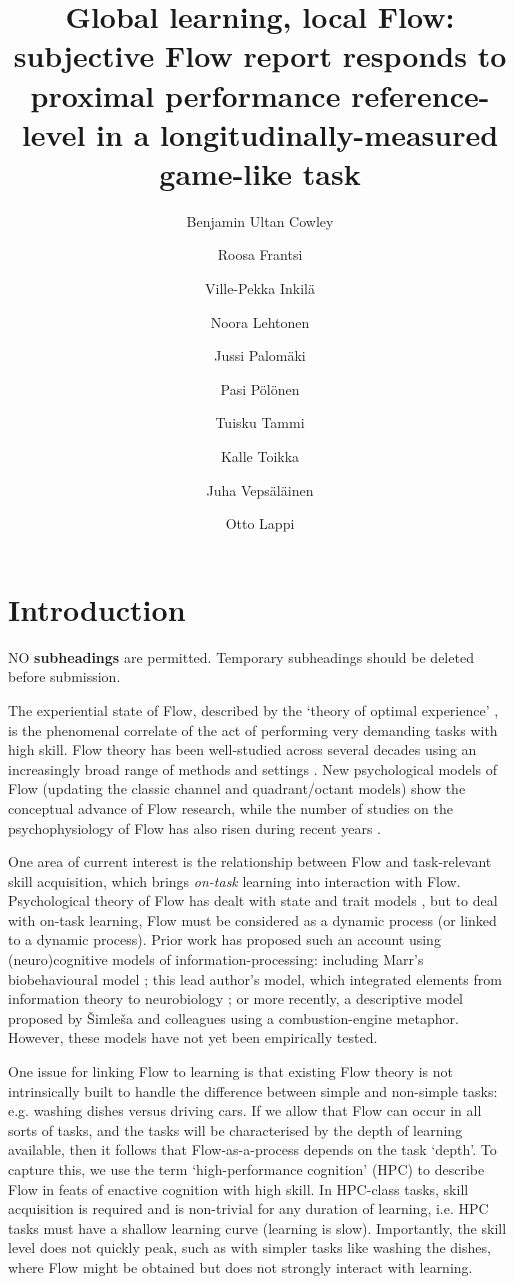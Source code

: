 \documentclass[fleqn,10pt]{wlscirep}
\title{Global learning, local Flow: subjective Flow report responds to proximal performance reference-level in a longitudinally-measured game-like task}
\author[1,2,*]{Benjamin Ultan Cowley}
\author[1]{Roosa Frantsi}%
\author[1,3]{Ville-Pekka Inkil\"{a}}%
\author[1]{Noora Lehtonen}%
\author[1]{Jussi Palom\"{a}ki}%
\author[1]{Pasi P\"{o}l\"{o}nen}
\author[1]{Tuisku Tammi}%
\author[1]{Kalle Toikka}%
\author[1]{Juha Veps\"{a}l\"{a}inen}%
\author[1]{Otto Lappi}
\affil[1]{Cognitive Science, Department of Digital Humanities, University of Helsinki, Helsinki, Finland}
\affil[2]{Cognitive Brain Research Unit, Department of Psychology and Logopedics, University of Helsinki,
Helsinki, Finland}
\affil[3]{Digitalization, Finnish Institute of Occupational Health, Helsinki, Finland}
\affil[*]{ben.cowley@helsinki.fi}
\affil[+]{these authors contributed equally to this work}
\begin{document}
\flushbottom
\maketitle
\thispagestyle{empty}

\section*{Introduction}
{\sf NO \textbf{subheadings} are permitted. Temporary subheadings should be deleted before submission.}

The experiential state of Flow, described by the `theory of optimal experience' \cite{Nakamura2002}, is the phenomenal correlate of the act of performing very demanding tasks with high skill. Flow theory has been well-studied across several decades using an increasingly broad range of methods and settings \cite{Engeser2012intro}. New psychological models of Flow \cite{Keller2012} (updating the classic channel and quadrant/octant models) show the conceptual advance of Flow research, while the number of studies on the psychophysiology of Flow has also risen during recent years \cite{Peifer2012,Peifer2014,Wolf2015,Harmat2015,Labonte-LeMoyne2016}.

One area of current interest is the relationship between Flow and task-relevant skill acquisition, which brings {\it on-task} learning into interaction with Flow. Psychological theory of Flow has dealt with state and trait models \cite{Moneta2012}, but to deal with on-task learning, Flow must be considered as a dynamic process (or linked to a dynamic process). Prior work has proposed such an account using (neuro)cognitive models of information-processing: including Marr's biobehavioural model \cite{Marr2001}; this lead author's model, which integrated elements from information theory to neurobiology \cite{Cowley2008}; or more recently, a descriptive model proposed by {\v{S}}imle{\v{s}}a and colleagues \cite{Simlesa2018} using a combustion-engine metaphor. However, these models have not yet been empirically tested.

One issue for linking Flow to learning is that existing Flow theory is not intrinsically built to handle the difference between simple and non-simple tasks: e.g. washing dishes versus driving cars. If we allow that Flow can occur in all sorts of tasks, and the tasks will be characterised by the depth of learning available, then it follows that Flow-as-a-process depends on the task `depth'. To capture this, we use the term `high-performance cognition' (HPC) to describe Flow in feats of enactive cognition with high skill. In HPC-class tasks, skill acquisition is required and is non-trivial for any duration of learning, i.e. HPC tasks must have a shallow learning curve (learning is slow). Importantly, the skill level does not quickly peak, such as with simpler tasks like washing the dishes, where Flow might be obtained but does not strongly interact with learning.
\end{document}
